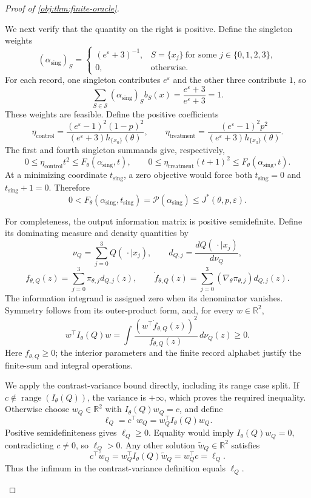 \documentclass[11pt]{article}
\begin{document}
\begin{proof}[Proof of \cref{obj:thm:finite-oracle}]
\begin{enumerate}
We next verify that the quantity on the right is positive. Define
the singleton weights
\[
(\alpha_{\mathrm{sing}})_S=
\begin{cases}
(e^\varepsilon+3)^{-1},&S=\{x_j\}\ \text{for some }j\in\{0,1,2,3\},\\
0,&\text{otherwise}.
\end{cases}
\]
For each record, one singleton contributes \(e^\varepsilon\)
and the other three contribute \(1\), so
\[
\sum_{S\in\mathcal S}
(\alpha_{\mathrm{sing}})_S b_S(x)
=\frac{e^\varepsilon+3}{e^\varepsilon+3}=1.
\]
These weights are feasible. Define the positive coefficients
\[
\eta_{\mathrm{control}}
=
\frac{(e^\varepsilon-1)^2(1-p)^2}
{(e^\varepsilon+3)h_{\{x_0\}}(\theta)},
\qquad
\eta_{\mathrm{treatment}}
=
\frac{(e^\varepsilon-1)^2p^2}
{(e^\varepsilon+3)h_{\{x_3\}}(\theta)}.
\]
The first and fourth singleton summands give, respectively,
\[
0\le\eta_{\mathrm{control}}t^2
\le F_\theta(\alpha_{\mathrm{sing}},t),
\qquad
0\le\eta_{\mathrm{treatment}}(t+1)^2
\le F_\theta(\alpha_{\mathrm{sing}},t).
\]
At a minimizing coordinate \(t_{\mathrm{sing}}\), a zero objective
would force both \(t_{\mathrm{sing}}=0\) and
\(t_{\mathrm{sing}}+1=0\). Therefore
\[
0<
F_\theta(\alpha_{\mathrm{sing}},t_{\mathrm{sing}})
=
\mathscr P(\alpha_{\mathrm{sing}})
\le J^*(\theta,p,\varepsilon).
\]

For completeness, the output information matrix is positive
semidefinite. Define its dominating measure and density quantities
by
\[
\nu_Q=\sum_{j=0}^3Q(\,\cdot\mid x_j),
\qquad
d_{Q,j}=\frac{dQ(\,\cdot\mid x_j)}{d\nu_Q},
\]
\[
f_{\theta,Q}(z)=\sum_{j=0}^3\pi_{\theta,j}d_{Q,j}(z),
\qquad
\dot f_{\theta,Q}(z)=
\sum_{j=0}^3(\nabla_\theta\pi_{\theta,j})d_{Q,j}(z).
\]
The information integrand is assigned zero when its denominator
vanishes. Symmetry follows from its outer-product form, and, for
every \(w\in\mathbb R^2\),
\[
w^\top I_\theta(Q)w
=
\int
\frac{(w^\top\dot f_{\theta,Q}(z))^2}
{f_{\theta,Q}(z)}\,d\nu_Q(z)\ge0.
\]
Here \(f_{\theta,Q}\ge0\); the interior parameters and the finite
record alphabet justify the finite-sum and integral operations.

We apply the contrast-variance bound directly, including its range
case split. If \(c\notin\operatorname{range}(I_\theta(Q))\), the
variance is \(+\infty\), which proves the required inequality.
Otherwise choose \(w_Q\in\mathbb R^2\) with
\(I_\theta(Q)w_Q=c\), and define
\[
\ell_Q=c^\top w_Q=w_Q^\top I_\theta(Q)w_Q.
\]
Positive semidefiniteness gives \(\ell_Q\ge0\). Equality would imply
\(I_\theta(Q)w_Q=0\), contradicting \(c\ne0\), so \(\ell_Q>0\).
Any other solution \(\widetilde w_Q\in\mathbb R^2\) satisfies
\[
c^\top\widetilde w_Q
=
w_Q^\top I_\theta(Q)\widetilde w_Q
=
w_Q^\top c
=\ell_Q.
\]
Thus the infimum in the contrast-variance definition equals
\(\ell_Q\).


\end{enumerate}
\end{proof}
\end{document}
